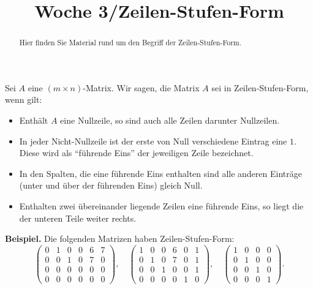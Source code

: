 \documentclass{ximera}
\title{Woche 3/Zeilen-Stufen-Form}
\begin{document}
\begin{abstract}
Hier finden Sie Material rund um den Begriff der Zeilen-Stufen-Form.
\end{abstract}
\maketitle

Sei $A$ eine $(m\times n)$-Matrix. Wir sagen, die Matrix $A$ sei in Zeilen-Stufen-Form, wenn gilt:
\begin{itemize}
\item
Enthält $A$ eine Nullzeile, so sind auch alle Zeilen darunter Nullzeilen.
\item
In jeder Nicht-Nullzeile ist der erste von Null verschiedene Eintrag eine $1$. Diese wird als ``führende Eins'' der jeweiligen Zeile bezeichnet.
\item
In den Spalten, die eine führende Eins enthalten sind alle anderen Einträge (unter und über der führenden Eins) gleich Null.
\item
Enthalten zwei übereinander liegende Zeilen eine führende Eins, so liegt die der unteren Teile weiter rechts.
\end{itemize}

\textbf{Beispiel.}
Die folgenden Matrizen haben Zeilen-Stufen-Form:
\[
\left(
\begin{array}{cccccc}
0 & 1 & 0 & 0 & 6 & 7 \\
0 & 0 & 1 & 0 & 7 & 0 \\
0 & 0 & 0 & 0 & 0 & 0 \\
0 & 0 & 0 & 0 & 0 & 0 
\end{array}
\right), \quad
%
\left(
\begin{array}{ccccccc}
1 & 0 & 0 & 6 & 0 & 1 \\
0 & 1 & 0 & 7 & 0 & 1 \\
0 & 0 & 1 & 0 & 0 & 1 \\
0 & 0 & 0 & 0 & 1 & 0
\end{array}
\right), \quad
%
\left(
\begin{array}{ccccc}
1 & 0 & 0 & 0 \\
0 & 1 & 0 & 0 \\
0 & 0 & 1 & 0 \\
0 & 0 & 0 & 1 
\end{array}
\right).
\]
\end{document}
